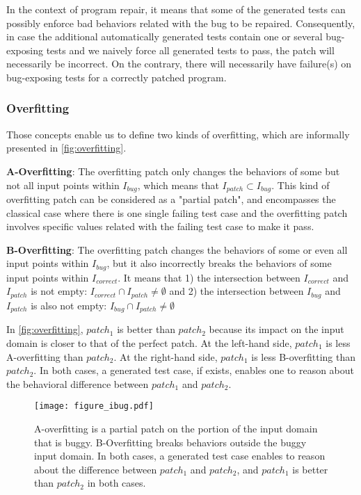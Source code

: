\documentclass[]{sig-alternate}
\begin{document}
In the context of program repair, it means that some of the generated tests can possibly enforce bad behaviors related with the bug to be repaired. 
Consequently, in case the additional automatically generated tests contain one or several bug-exposing tests and we naively force all generated tests to pass, the patch will necessarily be incorrect.
On the contrary, there will necessarily have failure(s) on bug-exposing tests for a correctly patched program. 

\subsubsection{Overfitting}
Those concepts enable us to define two kinds of overfitting, which are informally presented in \autoref{fig:overfitting}.

\textbf{A-Overfitting}: The overfitting patch only changes the behaviors of some but not all input points within $I_{bug}$, which means that $I_{patch} \subset I_{bug}$. This kind of overfitting patch can be considered as a "partial patch", and encompasses the classical case where there is one single failing test case and the overfitting patch involves specific values related with the failing test case to make it pass. 


\textbf{B-Overfitting}: 
The overfitting patch changes the behaviors of some or even all input points within $I_{bug}$, but it also incorrectly breaks the behaviors of some input points within $I_{correct}$.
It means that 
1) the intersection between $I_{correct}$ and $I_{patch}$ is not empty: $I_{correct} \cap I_{patch} \neq \emptyset $
and 2) the intersection between $I_{bug}$ and $I_{patch}$ is also not empty: $I_{bug} \cap I_{patch} \neq \emptyset $

In \autoref{fig:overfitting}, $patch_1$ is better than $patch_2$ because its impact on the input domain is closer to that of the perfect patch.
At the left-hand side, $patch_1$ is less A-overfitting than $patch_2$.
At the right-hand side, $patch_1$ is less B-overfitting than $patch_2$.
In both cases, a generated test case, if exists, enables one to reason about the behavioral difference between $patch_1$ and $patch_2$.

\begin{figure}
 \texttt{[image: figure\_ibug.pdf]}
 \caption{
A-overfitting is a partial patch on the portion of the input domain that is buggy.
B-Overfitting breaks behaviors outside the buggy input domain.
In both cases, a generated test case enables to reason about the difference between $patch_1$ and $patch_2$, and $patch_1$ is better than $patch_2$ in both cases.}
 \label{fig:overfitting}
\end{figure}
\end{document}
